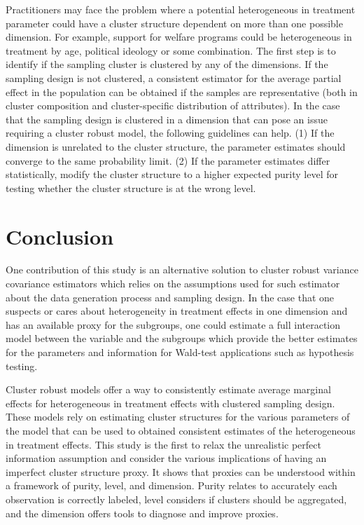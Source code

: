 \documentclass{jbsc}
\begin{document}
Practitioners may face the problem where a potential heterogeneous in treatment parameter could have a cluster structure dependent on more than one possible dimension. For example, support for welfare programs could be heterogeneous in treatment by age, political ideology or some combination. The first step is to identify if the sampling cluster is clustered by any of the dimensions. If the sampling design is not clustered, a consistent estimator for the average partial effect in the population can be obtained if the samples are representative (both in cluster composition and cluster-specific distribution of attributes). In the case that the sampling design is clustered in a dimension that can pose an issue requiring a cluster robust model, the following guidelines can help. (1) If the dimension is unrelated to the cluster structure, the parameter estimates should converge to the same probability limit. (2) If the parameter estimates differ statistically, modify the cluster structure to a higher expected purity level for testing whether the cluster structure is at the wrong level.

\FloatBarrier

\section{Conclusion}

One contribution of this study is an alternative solution to cluster robust variance covariance estimators which relies on the assumptions used for such estimator about the data generation process and sampling design. In the case that one suspects or cares about heterogeneity in treatment effects in one dimension and has an available proxy for the subgroups, one could estimate a full interaction model between the variable and the subgroups which provide the better estimates for the parameters and information for Wald-test applications such as hypothesis testing.

Cluster robust models offer a way to consistently estimate average marginal effects for heterogeneous in treatment effects with clustered sampling design. These models rely on estimating cluster structures for the various parameters of the model that can be used to obtained consistent estimates of the heterogeneous in treatment effects. This study is the first to relax the unrealistic perfect information assumption and consider the various implications of having an imperfect cluster structure proxy. It shows that proxies can be understood within a framework of purity, level, and dimension. Purity relates to accurately each observation is correctly labeled, level considers if clusters should be aggregated, and the dimension offers tools to diagnose and improve proxies.
\end{document}
